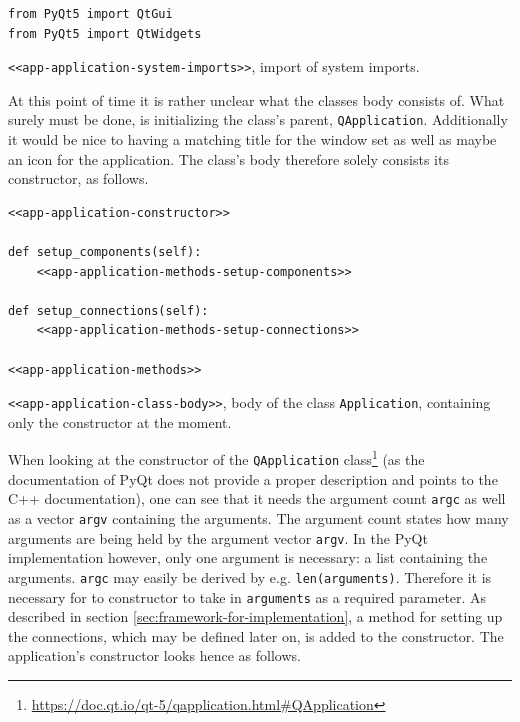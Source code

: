 \documentclass[10pt, openright, notitlepage]{scrreprt}
\begin{document}
\begin{listing}[H]
\begin{verbatim}
from PyQt5 import QtGui
from PyQt5 import QtWidgets
\end{verbatim}
\caption{\label{app-application-system-imports}
\texttt{<<app-application-system-imports>>}, import of system imports.}
\end{listing}

At this point of time it is rather unclear what the classes body consists of.
What surely must be done, is initializing the class's parent, \texttt{QApplication}.
Additionally it would be nice to having a matching title for the window set as
well as maybe an icon for the application. The class's body therefore solely
consists its constructor, as follows.

\begin{listing}[H]
\begin{verbatim}
<<app-application-constructor>>

def setup_components(self):
    <<app-application-methods-setup-components>>

def setup_connections(self):
    <<app-application-methods-setup-connections>>

<<app-application-methods>>
\end{verbatim}
\caption{\label{app-application-class-body}
\texttt{<<app-application-class-body>>}, body of the class \texttt{Application}, containing only the constructor at the moment.}
\end{listing}

When looking at the constructor of the \texttt{QApplication}
class\footnote{\url{https://doc.qt.io/qt-5/qapplication.html\#QApplication}} (as the
documentation of PyQt does not provide a proper description and points to the
C++ documentation), one can see that it needs the argument count \texttt{argc} as well
as a vector \texttt{argv} containing the arguments. The argument count states how many
arguments are being held by the argument vector \texttt{argv}. In the PyQt
implementation however, only one argument is necessary: a list containing the
arguments. \texttt{argc} may easily be derived by e.g. \texttt{len(arguments)}. Therefore it
is necessary for to constructor to take in \texttt{arguments} as a required parameter.
As described in section \ref{sec:framework-for-implementation}, a method for setting up
the connections, which may be defined later on, is added to the constructor. The
application's constructor looks hence as follows.
\end{document}
